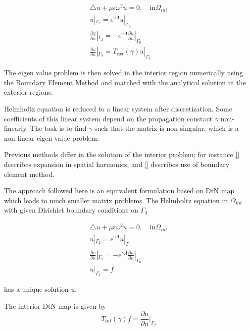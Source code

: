 \begin{equation}
\begin{array}{ll}
\triangle u + \mu \epsilon \omega^2 u = 0, \quad \textrm{in}
\Omega_{int} \\
u|_{\Gamma_2} = e^{\gamma \Lambda} u|_{\Gamma_0} \\
\frac{\partial u}{\partial n} |_{\Gamma_2} = -e^{\gamma \Lambda}
 \frac{\partial u}{\partial n} |_{\Gamma_0} \\
\frac{\partial u}{\partial n} |_{\Gamma_3} =  T_{ext}(\gamma) u|_{\Gamma_3}
\end{array}
\end{equation} 

 The eigen value problem is then solved in the interior region
numerically using the Boundary Element Method and matched with the
analytical solution in the exterior regions.

Helmholtz equation is reduced to a linear system after
discretization. Some coefficients of this linear system depend on the
propagation constant $\gamma$ non-linearly. The task is to find
$\gamma$ such that the matrix is non-singular, which is a non-linear
eigen value problem.

Previous methods differ in the solution of the interior problem; for
instance \ref{} describes expansion in spatial harmonics, and \ref{}
describes use of boundary element method.

The approach followed here is an equivalent formulation based on DtN
map which leads to much smaller matrix problems. The Helmholtz
equation in $\Omega_{int}$ with given Dirichlet boundary conditions on
$\Gamma_3$

\begin{equation}
\begin{array}{ll}
\triangle u + \mu \epsilon \omega^2 u = 0, \quad \textrm{in}
\Omega_{int} \\
u|_{\Gamma_2} = e^{\gamma \Lambda} u|_{\Gamma_0} \\
\frac{\partial u}{\partial n} |_{\Gamma_2} = -e^{\gamma \Lambda}
 \frac{\partial u}{\partial n} |_{\Gamma_0} \\
u|_{\Gamma_3} = f
\end{array}
\label{DtNf}
\end{equation} 

has a unique solution $u$.

The interior DtN map is given by
\begin{equation}
  T_{int}(\gamma) f = \frac{\partial u}{\partial n} |_{\Gamma_3}
\end{equation} 

